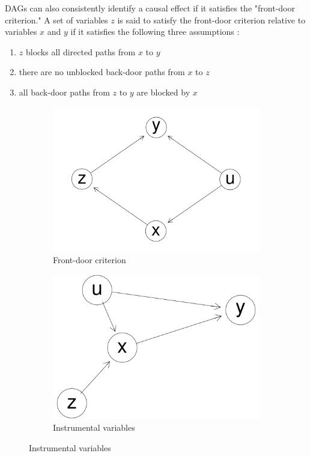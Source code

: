 \documentclass{article}
\begin{document}
DAGs can also consistently identify a causal effect if it satisfies the "front-door criterion." A set of variables $z$ is said to satisfy the front-door criterion relative to variables $x$ and $y$ if it satisfies the following three assumptions \parencite{pearl2009causality}:

\begin{enumerate}
  \item $z$ blocks all directed paths from $x$ to $y$
  \item there are no unblocked back-door paths from $x$ to $z$
  \item all back-door paths from $z$ to $y$ are blocked by $x$
\end{enumerate}

\begin{figure}
  \centering
  \begin{subfigure}{0.45\textwidth}
    \includegraphics[width=\linewidth]{images/frontdoor.png} 
    \caption{Front-door criterion}
    \label{dag8_fd}
  \end{subfigure}
  \begin{subfigure}{0.45\textwidth}
    \includegraphics[width=\linewidth]{images/iv.png}
    \caption{Instrumental variables}
    \label{dag8_iv}
  \end{subfigure}
\end{figure}
\end{document}
